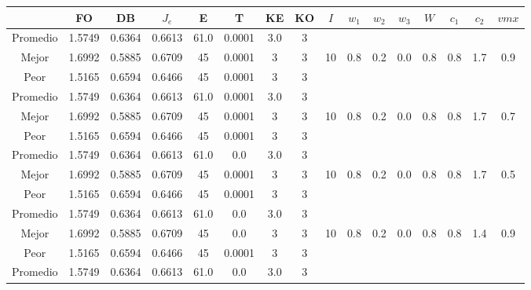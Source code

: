 \begin{table}[h!]
    \footnotesize
    \begin{center}
        \begin{tabular}{|c|c|c|c|c|c|c|c|c|c|c|c|c|c|c|c|}
        \hline
            & {\bf FO} & {\bf DB} & $J_e$ & {\bf E} & {\bf T} & {\bf KE} & {\bf KO} & $I$ & $w_1$ & $w_2$ & $w_3$ & $W$ & $c_1$ & $c_2$ & $vmx$ \\
        \hline
        \hline
            Promedio  & 1.5749 & 0.6364 & 0.6613 & 61.0 & 0.0001 & 3.0 & 3 &  &  &  &  &  &  &  & \\
            \cline{1-8}
            Mejor & 1.6992 & 0.5885  & 0.6709 & 45 & 0.0001 & 3 & 3 & 10 & 0.8 & 0.2 & 0.0 & 0.8 & 0.8 & 1.7 & 0.9\\
            \cline{1-8}
            Peor & 1.5165 & 0.6594  & 0.6466 & 45 & 0.0001 & 3 & 3 &  &  &  &  &  &  &  & \\
        \hline
        \hline
            Promedio  & 1.5749 & 0.6364 & 0.6613 & 61.0 & 0.0001 & 3.0 & 3 &  &  &  &  &  &  &  & \\
            \cline{1-8}
            Mejor & 1.6992 & 0.5885  & 0.6709 & 45 & 0.0001 & 3 & 3 & 10 & 0.8 & 0.2 & 0.0 & 0.8 & 0.8 & 1.7 & 0.7\\
            \cline{1-8}
            Peor & 1.5165 & 0.6594  & 0.6466 & 45 & 0.0001 & 3 & 3 &  &  &  &  &  &  &  & \\
        \hline
        \hline
            Promedio  & 1.5749 & 0.6364 & 0.6613 & 61.0 & 0.0 & 3.0 & 3 &  &  &  &  &  &  &  & \\
            \cline{1-8}
            Mejor & 1.6992 & 0.5885  & 0.6709 & 45 & 0.0001 & 3 & 3 & 10 & 0.8 & 0.2 & 0.0 & 0.8 & 0.8 & 1.7 & 0.5\\
            \cline{1-8}
            Peor & 1.5165 & 0.6594  & 0.6466 & 45 & 0.0001 & 3 & 3 &  &  &  &  &  &  &  & \\
        \hline
        \hline
            Promedio  & 1.5749 & 0.6364 & 0.6613 & 61.0 & 0.0 & 3.0 & 3 &  &  &  &  &  &  &  & \\
            \cline{1-8}
            Mejor & 1.6992 & 0.5885  & 0.6709 & 45 & 0.0 & 3 & 3 & 10 & 0.8 & 0.2 & 0.0 & 0.8 & 0.8 & 1.4 & 0.9\\
            \cline{1-8}
            Peor & 1.5165 & 0.6594  & 0.6466 & 45 & 0.0001 & 3 & 3 &  &  &  &  &  &  &  & \\
        \hline
        \hline
            Promedio  & 1.5749 & 0.6364 & 0.6613 & 61.0 & 0.0 & 3.0 & 3 &  &  &  &  &  &  &  & \\

\end{tabular}
\end{center}
\end{table}
